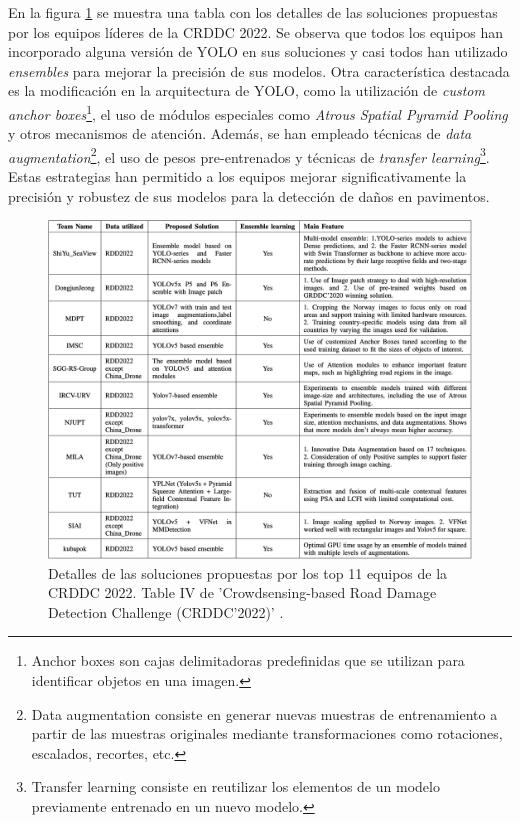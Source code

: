 En la figura \ref{fig:CRDDC2022_detailed_solutions} se muestra una tabla con los detalles de las soluciones propuestas por los equipos líderes de la CRDDC 2022. Se observa que todos los equipos han incorporado alguna versión de YOLO en sus soluciones y casi todos han utilizado \textit{ensembles} para mejorar la precisión de sus modelos. Otra característica destacada es la modificación en la arquitectura de YOLO, como la utilización de \textit{custom anchor boxes}\footnote{Anchor boxes son cajas delimitadoras predefinidas que se utilizan para identificar objetos en una imagen.}, el uso de módulos especiales como \textit{Atrous Spatial Pyramid Pooling} y otros mecanismos de atención. Además, se han empleado técnicas de \textit{data augmentation}\footnote{Data augmentation consiste en generar nuevas muestras de entrenamiento a partir de las muestras originales mediante transformaciones como rotaciones, escalados, recortes, etc.}, el uso de pesos pre-entrenados y técnicas de \textit{transfer learning}\footnote{Transfer learning consiste en reutilizar los elementos de un modelo previamente entrenado en un nuevo modelo.}. Estas estrategias han permitido a los equipos mejorar significativamente la precisión y robustez de sus modelos para la detección de daños en pavimentos.

\begin{figure}[H]
    \centering
    \includegraphics[width=1\textwidth]{../img/winner-solutions.png}
    \caption{Detalles de las soluciones propuestas por los top 11 equipos de la CRDDC 2022. Table IV de 'Crowdsensing-based Road Damage Detection Challenge (CRDDC’2022)' \cite{CRDDC2022_paper}.}
    \label{fig:CRDDC2022_detailed_solutions}
\end{figure}
\newpage

